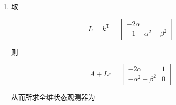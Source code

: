 \begin{example}
\begin{enumerate}
        \[
        \det(sI-A')=s^2-1
        \]

        由指定极点可得观测器的特征多项式为

        \[
        (s+\alpha-j\beta)(s+\alpha+j\beta)
        =s^2+2\alpha s+(\alpha^2+\beta^2)
        \]

        从而

        \[
        \bar{k}
        =
        \begin{bmatrix}
        \alpha_0-\alpha_0^* & \alpha_1-\alpha_1^*
        \end{bmatrix}
        =
        \begin{bmatrix}
        -1-\alpha^2-\beta^2 & -2\alpha
        \end{bmatrix}
        \]

        又

        \[
        P=
        \begin{bmatrix}
        b' & A'b'
        \end{bmatrix}
        \begin{bmatrix}
        a_1 & 1\\
        1 & 0
        \end{bmatrix}
        =
        \begin{bmatrix}
        0 & 1\\
        1 & 0
        \end{bmatrix}
        \]

        故所求矩阵 $k$ 为

        \[
        k=\bar{k}P^{-1}
        =
        \begin{bmatrix}
        -2\alpha & -1-\alpha^2-\beta^2
        \end{bmatrix}
        \]

        \item 取

        \[
        L=k^{\mathrm{T}}
        =
        \begin{bmatrix}
        -2\alpha\\
        -1-\alpha^2-\beta^2
        \end{bmatrix}
        \]

        则

        \[
        A+Lc=
        \begin{bmatrix}
        -2\alpha & 1\\
        -\alpha^2-\beta^2 & 0
        \end{bmatrix}
        \]

        从而所求全维状态观测器为


\end{enumerate}
\end{example}
